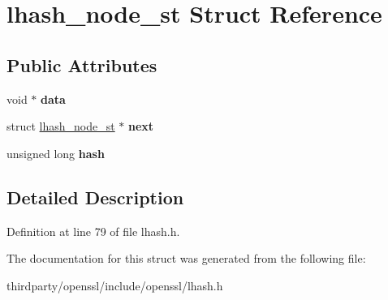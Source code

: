 \hypertarget{structlhash__node__st}{}\section{lhash\+\_\+node\+\_\+st Struct Reference}
\label{structlhash__node__st}
\subsection*{Public Attributes}
\begin{DoxyCompactItemize}
\item 
\mbox{\label{structlhash__node__st_a1bddfe54547a8c35edc658730d8edcb7}} 
void $\ast$ {\bfseries data}
\item 
\mbox{\label{structlhash__node__st_a9756db4182d64ae6212672d2d1cea695}} 
struct \hyperlink{structlhash__node__st}{lhash\+\_\+node\+\_\+st} $\ast$ {\bfseries next}
\item 
\mbox{\label{structlhash__node__st_adae3442cad55dbd25659909f8f15ced7}} 
unsigned long {\bfseries hash}
\end{DoxyCompactItemize}


\subsection{Detailed Description}


Definition at line 79 of file lhash.\+h.



The documentation for this struct was generated from the following file\+:\begin{DoxyCompactItemize}
\item 
thirdparty/openssl/include/openssl/lhash.\+h\end{DoxyCompactItemize}
